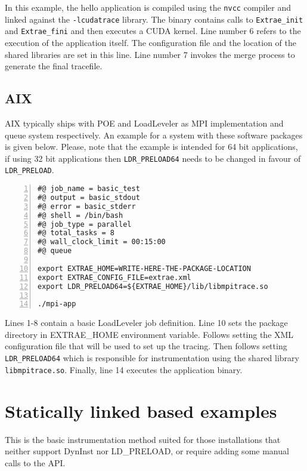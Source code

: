 In this example, the hello application is compiled using the {\tt nvcc} compiler and linked against the {\tt -lcudatrace} library. The binary contains calls to {\tt Extrae\_init} and {\tt Extrae\_fini} and then executes a CUDA kernel. Line number 6 refers to the execution of the application itself. The \TRACE configuration file and the location of the shared libraries are set in this line. Line number 7 invokes the merge process to generate the final tracefile.

\subsection{AIX}\label{subsec:Examples_AIX}

AIX typically ships with POE and LoadLeveler as MPI implementation and queue system respectively. An example for a system with these software packages is given below. Please, note that the example is intended for 64 bit applications, if using 32 bit applications then {\tt LDR\_PRELOAD64} needs to be changed in favour of {\tt LDR\_PRELOAD}.

\begin{Verbatim}[frame=single,numbers=left,labelposition=topline,label=ll-aix64.sh]
#@ job_name = basic_test
#@ output = basic_stdout
#@ error = basic_stderr
#@ shell = /bin/bash
#@ job_type = parallel
#@ total_tasks = 8
#@ wall_clock_limit = 00:15:00
#@ queue

export EXTRAE_HOME=WRITE-HERE-THE-PACKAGE-LOCATION
export EXTRAE_CONFIG_FILE=extrae.xml
export LDR_PRELOAD64=${EXTRAE_HOME}/lib/libmpitrace.so

./mpi-app
\end{Verbatim}

Lines 1-8 contain a basic LoadLeveler job definition. Line 10 sets the \TRACE package directory in EXTRAE\_HOME environment variable. Follows setting the XML configuration file that will be used to set up the tracing. Then follows setting {\tt LDR\_PRELOAD64} which is responsible for instrumentation using the shared library {\tt libmpitrace.so}. Finally, line 14 executes the application binary.

\section{Statically linked based examples}\label{sec:Examples_static}

This is the basic instrumentation method suited for those installations that neither support DynInst nor LD\_PRELOAD, or require adding some manual calls to the \TRACE API.

